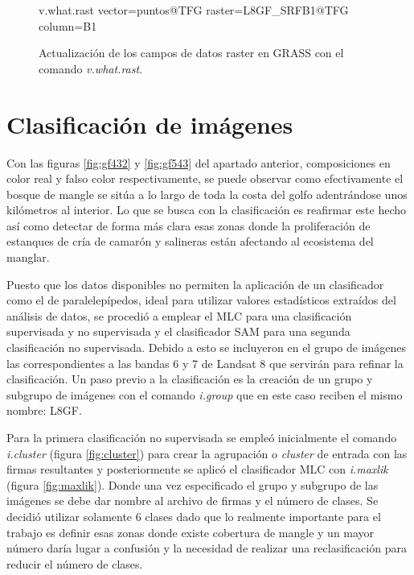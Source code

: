 \begin{figure}[ht]
\centering
\begin{boxedverbatim}
	v.what.rast vector=puntos@TFG raster=L8GF_SRFB1@TFG column=B1
\end{boxedverbatim}
\caption[Actualización de los datos raster]{Actualización de los campos de datos raster en GRASS con el comando \textit{v.what.rast}.}
\label{fig:v.what.rast}
\end{figure}

\section{Clasificación de imágenes}
Con las figuras \ref{fig:gf432} y \ref{fig:gf543} del apartado anterior, composiciones en color real y falso color respectivamente, se puede observar como efectivamente el bosque de mangle se sitúa a lo largo de toda la costa del golfo adentrándose unos kilómetros al interior. Lo que se busca con la clasificación es reafirmar este hecho así como detectar de forma más clara esas zonas donde la proliferación de estanques de cría de camarón y salineras están afectando al ecosistema del manglar.\Sep

Puesto que los datos disponibles no permiten la aplicación de un clasificador como el de paralelepípedos, ideal para utilizar valores estadísticos extraídos del análisis de datos, se procedió a emplear el \ac{MLC} para una clasificación supervisada y no supervisada y el clasificador \ac{SAM} para una segunda clasificación no supervisada. Debido a esto se incluyeron en el grupo de imágenes las correspondientes a las bandas 6 y 7 de Landsat 8 que servirán para refinar la clasificación. Un paso previo a la clasificación es la creación de un grupo y subgrupo de imágenes con el comando \textit{i.group} que en este caso reciben el mismo nombre: L8GF.\Sep

Para la primera clasificación no supervisada se empleó inicialmente el comando \textit{i.cluster} (figura \ref{fig:cluster}) para crear la agrupación o \textit{cluster} de entrada con las firmas resultantes y posteriormente se aplicó el clasificador \ac{MLC} con \textit{i.maxlik} (figura \ref{fig:maxlik}). Donde una vez especificado el grupo y subgrupo de las imágenes se debe dar nombre al archivo de firmas y el número de clases. Se decidió utilizar solamente 6 clases dado que lo realmente importante para el trabajo es definir esas zonas donde existe cobertura de mangle y un mayor número daría lugar a confusión y la necesidad de realizar una reclasificación para reducir el número de clases.\Sep

